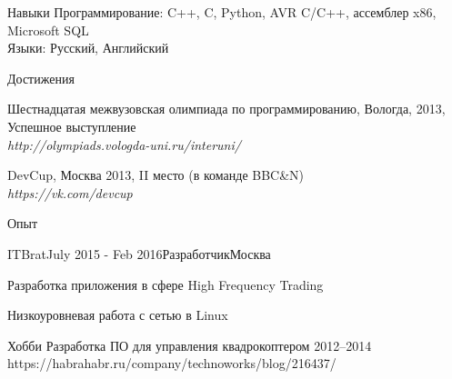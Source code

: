 \documentclass{resume} %
\begin{document}
\begin{rSection}{Навыки}
Программирование: C++, C, Python, AVR C/C++, ассемблер x86, Microsoft SQL\\
Языки: Русский, Английский
\end{rSection}


\begin{rSection}{Достижения}
\item Шестнадцатая межвузовская олимпиада по программированию, Вологда, 2013, Успешное выступление \\
\hfill {\em http://olympiads.vologda-uni.ru/interuni/}
\item DevCup, Москва 2013, II место (в команде BBC\&N)\\
\hfill {\em https://vk.com/devcup}
\end{rSection}


\begin{rSection}{Опыт}
	
	
	
	\begin{rSubsection}{ITBrat}{July 2015 - Feb 2016}{Разработчик}{Москва}
		\item Разработка приложения в сфере High Frequency Trading
		\item Низкоуровневая работа с сетью в Linux
	\end{rSubsection}
	
	
\end{rSection}

\begin{rSection}{Хобби}
	Разработка ПО для управления квадрокоптером 2012--2014\\
	https://habrahabr.ru/company/technoworks/blog/216437/
\end{rSection}

\end{document}
